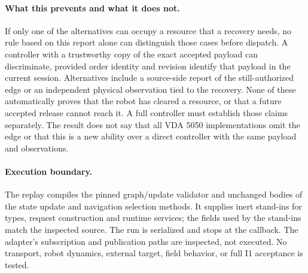 \documentclass[11pt]{article}
\begin{document}
\paragraph{What this prevents and what it does not.}
If only one of the alternatives can occupy a resource that a recovery
needs, no rule based on this report alone can distinguish those
cases before dispatch. A controller with a trustworthy copy of the
exact accepted payload can discriminate, provided order identity and
revision identify that payload in the current session. Alternatives
include a source-side report of the still-authorized edge or an
independent physical observation tied to the recovery. None of these
automatically proves that the robot has cleared a resource, or that a
future accepted release cannot reach it. A full controller must
establish those claims separately. The result does not say that all
VDA 5050 implementations omit the edge or that this is a new ability
over a direct controller with the same payload and observations.

\paragraph{Execution boundary.}
The replay compiles the pinned graph/update validator and unchanged
bodies of the state update and navigation selection methods. It
supplies inert stand-ins for types, request construction and runtime
services; the fields used by the stand-ins match the inspected source.
The run is serialized and stops at the callback. The adapter's
subscription and publication paths are inspected, not executed.
No transport, robot dynamics, external target, field behavior,
or full I1 acceptance is tested.
\end{document}
